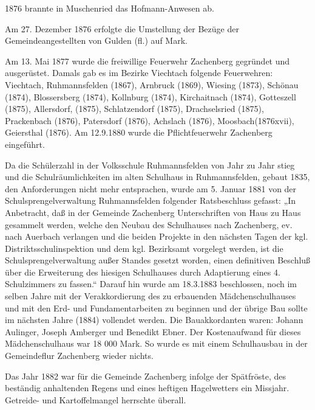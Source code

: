 \documentclass{book}
\begin{document}
1876 brannte in Muschenried das Hofmann-Anwesen ab.

Am 27. Dezember 1876 erfolgte die Umstellung der Bezüge der Gemeindeangestellten
von Gulden (fl.) auf Mark.

Am 13. Mai 1877 wurde die freiwillige Feuerwehr Zachenberg gegründet und
ausgerüstet. Damals gab es im Bezirke Viechtach folgende Feuerwehren: Viechtach,
Ruhmannsfelden (1867), Arnbruck (1869), Wiesing (1873), Schönau (1874),
Blossersberg (1874), Kollnburg (1874), Kirchaitnach (1874), Gotteszell (1875),
Allersdorf, (1875), Schlatzendorf (1875), Drachselsried (1875), Prackenbach
(1876), Patersdorf (1876), Achslach (1876), Moosbach(1876xvii), Geiersthal
(1876). Am 12.9.1880 wurde die Pflichtfeuerwehr Zachenberg eingeführt.

Da die Schülerzahl in der Volksschule Ruhmannsfelden von Jahr zu Jahr stieg und
die Schulräumlichkeiten im alten Schulhaus in Ruhmannsfelden, gebaut 1835, den
Anforderungen nicht mehr entsprachen, wurde am 5. Januar 1881 von der
Schulsprengelverwaltung Ruhmannsfelden folgender Ratsbeschluss gefasst: „In
Anbetracht, daß in der Gemeinde Zachenberg Unterschriften von Haus zu Haus
gesammelt werden, welche den Neubau des Schulhauses nach Zachenberg, ev. nach
Auerbach verlangen und die beiden Projekte in den nächsten Tagen der kgl.
Distriktsschulinspektion und dem kgl. Bezirksamt vorgelegt werden, ist die
Schulsprengelverwaltung außer Standes gesetzt worden, einen definitiven Beschluß
über die Erweiterung des hiesigen Schulhauses durch Adaptierung eines 4.
Schulzimmers zu fassen.“ Darauf hin wurde am 18.3.1883 beschlossen, noch im
selben Jahre mit der Verakkordierung des zu erbauenden Mädchenschulhauses und
mit den Erd- und Fundamentarbeiten zu beginnen und der übrige Bau sollte im
nächsten Jahre (1884) vollendet werden. Die Bauakkordanten waren: Johann
Aulinger, Joseph Amberger und Benedikt Ebner. Der Kostenaufwand für dieses
Mädchenschulhaus war 18 000 Mark. So wurde es mit einem Schulhausbau in der
Gemeindeflur Zachenberg wieder nichts.

Das Jahr 1882 war für die Gemeinde Zachenberg infolge der Spätfröste, des
beständig anhaltenden Regens und eines heftigen Hagelwetters ein Missjahr.
Getreide- und Kartoffelmangel herrschte überall.
\end{document}
